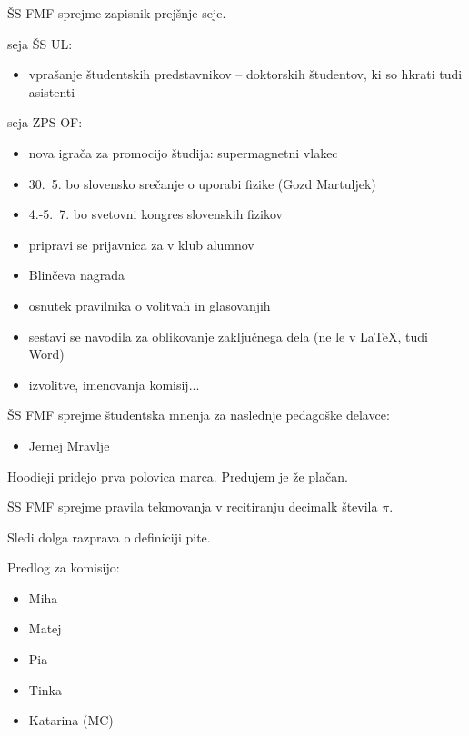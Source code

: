 \documentclass{seja}
\begin{document}
\begin{ad}
    \item
    \begin{sklep*}
        ŠS FMF sprejme zapisnik prejšnje seje.
    \end{sklep*}

    \item
    seja ŠS UL:
	\begin{itemize}
	    \item vprašanje študentskih predstavnikov -- doktorskih študentov, ki so hkrati tudi asistenti
	\end{itemize}
    seja ZPS OF:
	\begin{itemize}
	    \item nova igrača za promocijo študija: supermagnetni vlakec
	    \item 30.~5. bo slovensko srečanje o uporabi fizike (Gozd Martuljek)
	    \item 4.-5.~7. bo svetovni kongres slovenskih fizikov
	    \item pripravi se prijavnica za v klub alumnov
	    \item Blinčeva nagrada
	    \item osnutek pravilnika o volitvah in glasovanjih
	    \item sestavi se navodila za oblikovanje zaključnega dela (ne le v LaTeX, tudi Word)
	    \item izvolitve, imenovanja komisij...
	\end{itemize}

	\item
    \begin{sklep*}
    ŠS FMF sprejme študentska mnenja za naslednje pedagoške delavce:
        \begin{itemize}
            \item Jernej Mravlje
        \end{itemize}
    \end{sklep*}

    \item Hoodieji pridejo prva polovica marca. Predujem je že plačan.

    \item
    \begin{sklep*}
        ŠS FMF sprejme pravila tekmovanja v recitiranju decimalk števila $\pi$.
    \end{sklep*}

    Sledi dolga razprava o definiciji pite.

    Predlog za komisijo:
        \begin{itemize}
            \item Miha
            \item Matej
            \item Pia
            \item Tinka
            \item Katarina (MC)
        \end{itemize}


\end{ad}
\end{document}
